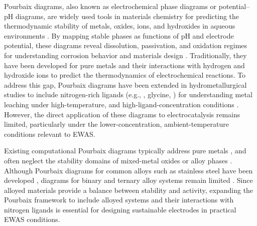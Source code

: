 \documentclass[journal=jacsat,manuscript=article]{achemso}
\begin{document}
Pourbaix diagrams, also known as electrochemical phase diagrams or potential–pH diagrams, are widely used tools in materials chemistry for predicting the thermodynamic stability of metals, oxides, ions, and hydroxides in aqueous environments \cite{PourbaixAtlasSolutions, Huang2015ElectrochemicalCalculations, McCafferty2010ThermodynamicsDiagrams}. By mapping stable phases as functions of pH and electrode potential, these diagrams reveal dissolution, passivation, and oxidation regimes for understanding corrosion behavior and materials design \cite{Stack2005BridgingDiagrams, Pourbaix1973LecturesCorrosion, Fontana1987CorrosionCompany}. Traditionally, they have been developed for pure metals and their interactions with hydrogen and hydroxide ions \cite{Huang2017ImprovedCompounds, Wang2020PredictingFunctional, Cao2020E-pHLaterite} to predict the thermodynamics of electrochemical reactions. To address this gap, Pourbaix diagrams have been extended in hydrometallurgical studies to include nitrogen-rich ligands (e.g., , glycine, ) for understanding metal leaching under high-temperature, and high-ligand-concentration conditions \cite{Meng1996PrinciplesReview, NasuhaYahya2019ThermodynamicDiagram, Barragan2021LeachingOptimization, OConnor2018ElectrochemicalSolutions, Seke2006EffectSphalerite}. However, the direct application of these diagrams to electrocatalysis remains limited, particularly under the lower-concentration, ambient-temperature conditions relevant to EWAS.

Existing computational Pourbaix diagrams typically address pure metals \cite{PourbaixAtlasSolutions, Cao2020E-pHLaterite, HongOn, Meng1996PrinciplesReview}, and often neglect the stability domains of mixed-metal oxides or alloy phases \cite{Ding2018ElectrochemicalStates}. Although Pourbaix diagrams for common alloys such as stainless steel have been developed \cite{Cubicciotti1985TheSteel, Beverskog1999PourbaixIron-Chromium-Nickel}, diagrams for binary and ternary alloy systems remain limited \cite{Dong2021ElectrochemicalData, Ding2018ElectrochemicalStates}. Since alloyed materials provide a balance between stability and activity, expanding the Pourbaix framework to include alloyed systems and their interactions with nitrogen ligands is essential for designing sustainable electrodes in practical EWAS conditions.
\end{document}
